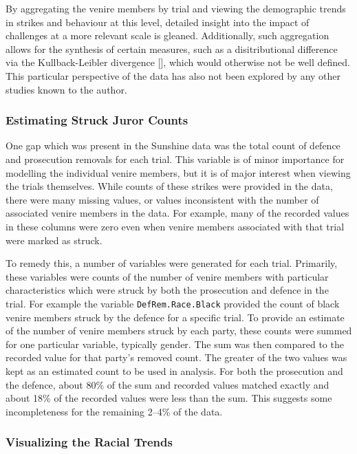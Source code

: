 By aggregating the venire members by trial and viewing the demographic trends in strikes and behaviour at this level,
detailed insight into the impact of challenges at a more relevant scale is gleaned. Additionally, such aggregation allows for
the synthesis of certain measures, such as a disitributional difference via the Kullback-Leibler divergence [\cite{kullback1951}],
which would otherwise not be well defined. This particular perspective of the data has also not been explored by any other studies
known to the author.

\subsubsection{Estimating Struck Juror Counts} \label{subsec:struckjur}

One gap which was present in the Sunshine data was the total count of defence and prosecution removals for each trial. This
variable is of minor importance for modelling the individual venire
members, but it is of major interest when viewing the trials
themselves. While counts of these strikes were provided in the data, there were many missing values, or values inconsistent with
the number of associated venire members in the data. For example, many of the recorded values in these columns were zero even when
venire members associated with that trial were marked as struck.

To remedy this, a number of variables were generated for each trial. Primarily, these variables were counts of the number of
venire members with particular characteristics which were struck by both the prosecution and defence in the trial. For example the
variable \texttt{DefRem.Race.Black} provided the count of black venire members struck by the defence for a specific trial. To
provide an estimate of the number of venire members struck by each
party, these counts were summed for one particular
variable, typically gender. The sum was then compared to the recorded value for that party's removed count. The greater of the two
values was kept as an estimated count to be used in analysis. For both the prosecution and the defence, about 80\% of the sum and
recorded values matched exactly and about 18\% of the recorded values were less than the sum. This suggests some incompleteness
for the remaining 2--4\% of the data.

\subsubsection{Visualizing the Racial Trends} \label{subsec:vistrend}

